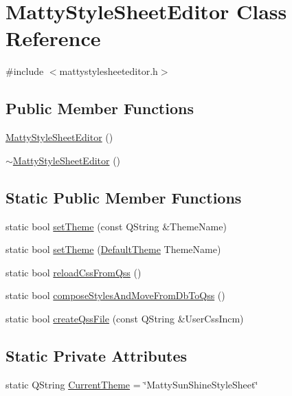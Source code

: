 \hypertarget{class_matty_style_sheet_editor}{}\section{Matty\+Style\+Sheet\+Editor Class Reference}
\label{class_matty_style_sheet_editor}


{\ttfamily \#include $<$mattystylesheeteditor.\+h$>$}

\subsection*{Public Member Functions}
\begin{DoxyCompactItemize}
\item 
\hyperlink{class_matty_style_sheet_editor_ad99a6c56d91fcc24dc8e36bfbe34eda9}{Matty\+Style\+Sheet\+Editor} ()
\item 
\hyperlink{class_matty_style_sheet_editor_a53d519a70068544b30fb38db6eaf86a4}{$\sim$\+Matty\+Style\+Sheet\+Editor} ()
\end{DoxyCompactItemize}
\subsection*{Static Public Member Functions}
\begin{DoxyCompactItemize}
\item 
static bool \hyperlink{class_matty_style_sheet_editor_aec3ccdf356aab4c3156562465e779498}{set\+Theme} (const Q\+String \&Theme\+Name)
\item 
static bool \hyperlink{class_matty_style_sheet_editor_aea0577b5a1a832ae46f9ad8c4fbe79e2}{set\+Theme} (\hyperlink{mattystylesheeteditor_8h_ad58d92f62ffa3431951b8423c85d841d}{Default\+Theme} Theme\+Name)
\item 
static bool \hyperlink{class_matty_style_sheet_editor_abe6c7273e15a62c5f170bec00f539823}{reload\+Css\+From\+Qss} ()
\item 
static bool \hyperlink{class_matty_style_sheet_editor_a7fb053e16e10b506fa606c68518b35ec}{compose\+Styles\+And\+Move\+From\+Db\+To\+Qss} ()
\item 
static bool \hyperlink{class_matty_style_sheet_editor_a94dfac4549bd0ee472ba4dcb82562779}{create\+Qss\+File} (const Q\+String \&User\+Css\+Incm)
\end{DoxyCompactItemize}
\subsection*{Static Private Attributes}
\begin{DoxyCompactItemize}
\item 
static Q\+String \hyperlink{class_matty_style_sheet_editor_afcf37fdaf80bc841551e62245c1e0343}{Current\+Theme} = \char`\"{}Matty\+Sun\+Shine\+Style\+Sheet\char`\"{}
\end{DoxyCompactItemize}


